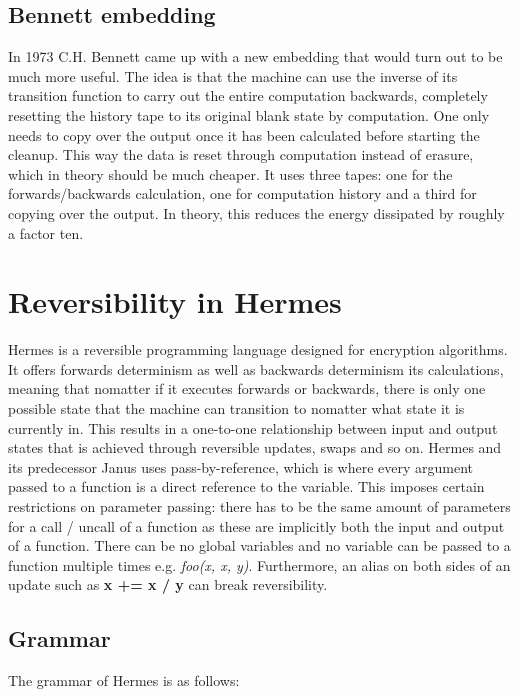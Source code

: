 \subsection{Bennett embedding}
In 1973 C.H. Bennett came up with a new embedding that would turn out to be much more useful\cite{Bennett1973LogicalRO}.
The idea is that the machine can use the inverse of its transition function to carry out the entire computation backwards, completely resetting the history tape to its original blank state by computation. One only needs to copy over the output once it has been calculated before starting the cleanup. This way the data is reset through computation instead of erasure, which in theory should be much cheaper.
It uses three tapes: one for the forwards/backwards calculation, one for computation history and a third for copying over the output. 
In theory, this reduces the energy dissipated by roughly a factor ten.

\section{Reversibility in Hermes}
Hermes is a reversible programming language designed for encryption algorithms. It offers forwards determinism as well as backwards determinism its calculations, meaning that nomatter if it executes forwards or backwards,  there is only one possible state that the machine can transition to nomatter what state it is currently in.
This results in a one-to-one relationship between input and output states that is achieved through reversible updates, swaps and so on.
Hermes and its predecessor Janus uses pass-by-reference, which is where every argument passed to a function is a direct reference to the variable.
This imposes certain restrictions on parameter passing: there has to be the same amount of parameters for a call / uncall of a function as these are implicitly both the input and output of a function.
There can be no global variables and no variable can be passed to a function multiple times e.g. \emph{foo(x, x, y)}.
Furthermore, an alias on both sides of an update such as \textbf{x += x / y} can break reversibility.

\subsection{Grammar}
The grammar of Hermes is as follows:



